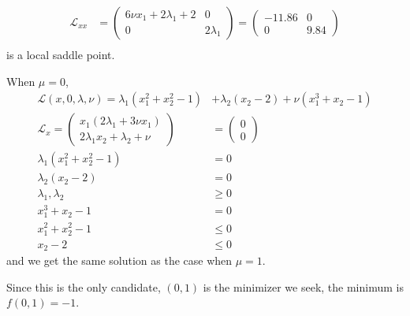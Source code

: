 \documentclass[12pt]{article}
\begin{document}
\begin{problem}[2]
\begin{align*}
	\mathscr{L}_{x x} &= \begin{pmatrix} 6\nu x_1+2\lambda_1+2&0\\0&2\lambda_1 \end{pmatrix} = \begin{pmatrix} -11.86&0\\0&9.84 \end{pmatrix}  \\
\end{align*}
is a local saddle point.

When $ \mu=0$,
\begin{align*}
	\mathscr{L}(x,0,\lambda,\nu) = \lambda_1(x_1^2+x_2^2-1) &+ \lambda_2(x_2-2)+ \nu(x_1^3+x_2-1) \\
	\mathscr{L}_x= \begin{pmatrix} x_1(2 \lambda_1 + 3 \nu x_1)\\ 2\lambda_1 x_2+ \lambda_2 + \nu \end{pmatrix} &= \begin{pmatrix} 0\\0 \end{pmatrix}  \\
	\lambda_1 (x_1^2+x_2^2 -1 ) &= 0 \\
	\lambda_2 (x_2 -2) &= 0 \\
	\lambda_1 , \lambda_2  &\geq 0\\
	x_1^3+x_2-1 &= 0 \\
	x_1^2+x_2^2 -1 &\leq 0\\
	x_2 -2	& \leq 0
\end{align*}
and we get the same solution as the case when $ \mu=1$.

Since this is the only candidate, $ (0,1)$ is the minimizer we seek, the minimum is $ f(0,1)=-1$.
\end{problem}
\end{document}
